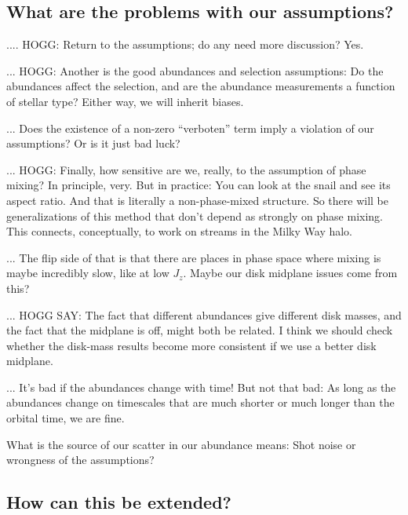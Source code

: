 \documentclass[modern]{aastex63}
\begin{document}
\subsection{What are the problems with our assumptions?}

.... HOGG: Return to the assumptions; do any need more discussion? Yes.

... HOGG: Another is the good abundances and selection assumptions: Do the abundances affect
the selection, and are the abundance measurements a function of stellar type? Either way,
we will inherit biases.

... Does the existence of a non-zero ``verboten'' term imply a violation of our
assumptions?
Or is it just bad luck?

... HOGG: Finally, how sensitive are we, really, to the assumption of
phase mixing? In principle, very. But in practice: You can look at the
snail and see its aspect ratio. And that is literally a
non-phase-mixed structure. So there will be generalizations of this
method that don't depend as strongly on phase mixing. This connects,
conceptually, to work on streams in the Milky Way halo.

... The flip side of that is that there are places in phase space where
mixing is maybe incredibly slow, like at low $J_z$. Maybe our disk
midplane issues come from this?

... HOGG SAY: The fact that different abundances give
different disk masses, and the fact that the midplane is off, might
both be related. I think we should check whether the disk-mass results
become more consistent if we use a better disk midplane.

... It's bad if the abundances change with time! But not that bad: As
long as the abundances change on timescales that are much shorter or
much longer than the orbital time, we are fine.

What is the source of our scatter in our abundance means: Shot noise
or wrongness of the assumptions?

\subsection{How can this be extended?}
\end{document}
